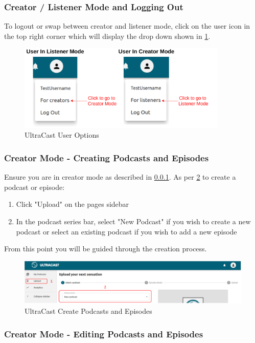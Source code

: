 \documentclass[../report.tex]{subfiles}
\begin{document}
\subsubsection{Creator / Listener Mode and Logging Out} \label{sssec:user_modes}
To logout or swap between creator and listener mode, click on the user icon in the top right corner
which will display the drop down shown in \cref{fig:UM_user_options}.
\begin{figure}[ht]
    \centering
    \includegraphics[width=10cm]{resources/UM_CLL}
    \caption{UltraCast User Options}
    \label{fig:UM_user_options} 
\end{figure}

\subsubsection{Creator Mode - Creating Podcasts and Episodes}
Ensure you are in creator mode as described in \cref{sssec:user_modes}. As per \cref{fig:UM_create} to create
a podcast or episode:
\begin{enumerate}
    \item Click "Upload" on the pages sidebar
    \item In the podcast series bar, select "New Podcast" if you wish to create a new podcast or select an existing podcast if you wish to add a new episode
\end{enumerate}
%
From this point you will be guided through the creation process.
\begin{figure}[ht]
    \centering
    \includegraphics[width=16cm]{resources/UM_Create}
    \caption{UltraCast Create Podcasts and Episodes}
    \label{fig:UM_create} 
\end{figure}

\subsubsection{Creator Mode - Editing Podcasts and Episodes}
\end{document}
